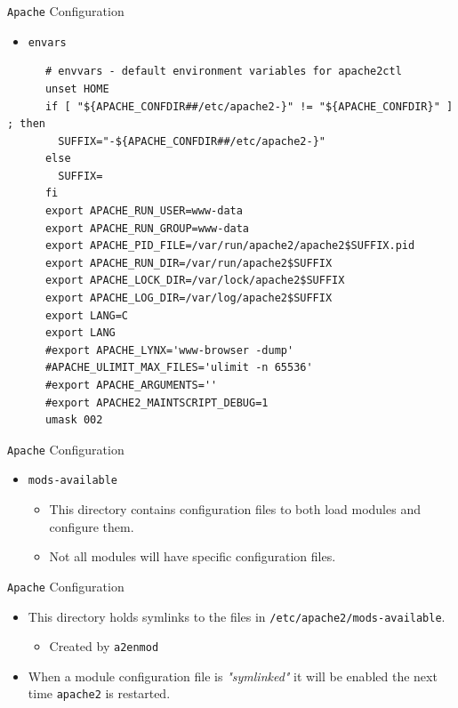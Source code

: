 \documentclass[xcolor=table]{beamer}
\begin{document}
\begin{frame}[fragile]{\texttt{Apache} Configuration}
  \begin{itemize}
    \item \texttt{envars}
  \end{itemize}
  \begin{tcolorbox}
    \lstset{
      basicstyle=\tiny\ttfamily,
    }
    \begin{lstlisting}
      # envvars - default environment variables for apache2ctl
      unset HOME
      if [ "${APACHE_CONFDIR##/etc/apache2-}" != "${APACHE_CONFDIR}" ] ; then
        SUFFIX="-${APACHE_CONFDIR##/etc/apache2-}"
      else
        SUFFIX=
      fi
      export APACHE_RUN_USER=www-data
      export APACHE_RUN_GROUP=www-data
      export APACHE_PID_FILE=/var/run/apache2/apache2$SUFFIX.pid
      export APACHE_RUN_DIR=/var/run/apache2$SUFFIX
      export APACHE_LOCK_DIR=/var/lock/apache2$SUFFIX
      export APACHE_LOG_DIR=/var/log/apache2$SUFFIX
      export LANG=C
      export LANG
      #export APACHE_LYNX='www-browser -dump'
      #APACHE_ULIMIT_MAX_FILES='ulimit -n 65536'
      #export APACHE_ARGUMENTS=''
      #export APACHE2_MAINTSCRIPT_DEBUG=1
      umask 002
    \end{lstlisting}
  \end{tcolorbox}
\end{frame}

\begin{frame}{\texttt{Apache} Configuration}
  \begin{itemize}
    \item \texttt{mods-available}
      \begin{itemize}
        \item This directory contains configuration files to both load modules and configure them. 
        \item Not all modules will have specific configuration files.
      \end{itemize}
  \end{itemize}
\end{frame}

\begin{frame}{\texttt{Apache} Configuration}
  \begin{itemize}
    \item This directory holds symlinks to the files in \texttt{/etc/apache2/mods-available}. 
      \begin{itemize}
        \item Created by \texttt{a2enmod}
      \end{itemize}
    \item When a module configuration file is \textit{"symlinked"} it will be enabled the next time \texttt{apache2} is restarted.
  \end{itemize}
\end{frame}
\end{document}
